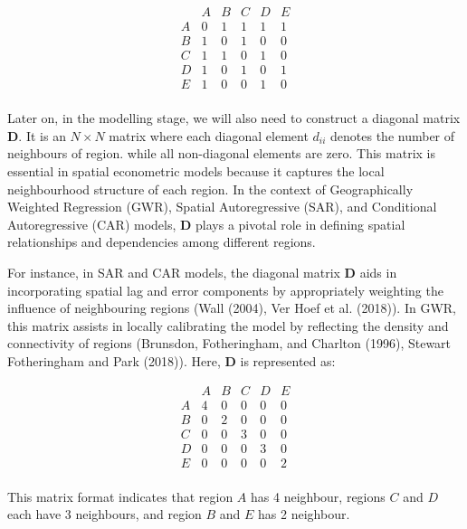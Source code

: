 \documentclass[
  default,
]{sn-jnl}
\begin{document}
\[
\begin{array}{cccccc}
    & A & B & C & D & E \\
A & 0 & 1 & 1 & 1 & 1\\ 
B & 1 & 0 & 1 & 0 & 0\\ 
C & 1 & 1 & 0 & 1 & 0\\
D & 1 & 0 & 1 & 0 & 1\\
E & 1 & 0 & 0 & 1 & 0\\
\end{array}
\]

Later on, in the modelling stage, we will also need to construct a
diagonal matrix \(\boldsymbol{D}\). It is an \(N \times N\) matrix where
each diagonal element \(d_{ii}\) denotes the number of neighbours of
region. while all non-diagonal elements are zero. This matrix is
essential in spatial econometric models because it captures the local
neighbourhood structure of each region. In the context of Geographically
Weighted Regression (GWR), Spatial Autoregressive (SAR), and Conditional
Autoregressive (CAR) models, \(\boldsymbol{D}\) plays a pivotal role in
defining spatial relationships and dependencies among different regions.

For instance, in SAR and CAR models, the diagonal matrix
\(\boldsymbol{D}\) aids in incorporating spatial lag and error
components by appropriately weighting the influence of neighbouring
regions (Wall (2004), Ver Hoef et al. (2018)). In GWR, this matrix
assists in locally calibrating the model by reflecting the density and
connectivity of regions (Brunsdon, Fotheringham, and Charlton (1996),
Stewart Fotheringham and Park (2018)). Here, \(\boldsymbol{D}\) is
represented as:

\[
\begin{array}{cccccc}
   & A & B & C & D & E \\
A & 4 & 0 & 0 & 0 & 0\\ 
B & 0 & 2 & 0 & 0 & 0\\ 
C & 0 & 0 & 3 & 0 & 0\\
D & 0 & 0 & 0 & 3 & 0\\
E & 0 & 0 & 0 & 0 & 2\\
\end{array}
\]

This matrix format indicates that region \(A\) has 4 neighbour, regions
\(C\) and \(D\) each have 3 neighbours, and region \(B\) and \(E\) has 2
neighbour.
\end{document}
